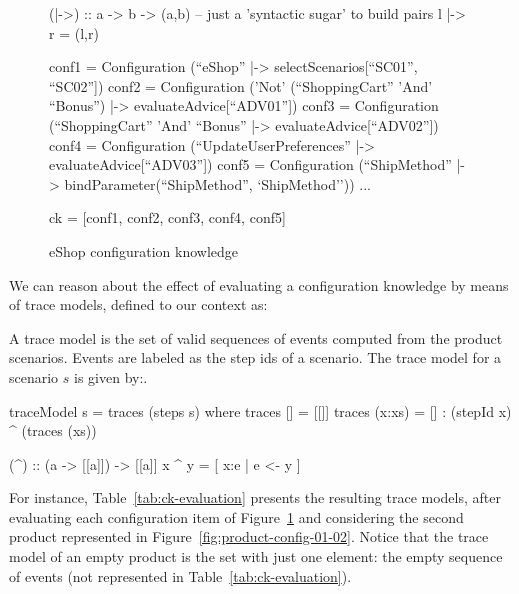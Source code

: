 \begin{figure}[hbt]
 \begin{code}
  (|->) :: a -> b -> (a,b) -- just a 'syntactic sugar' to build pairs
  l |-> r = (l,r)

  conf1 = Configuration (``eShop'' |-> selectScenarios[``SC01'', ``SC02''])
  conf2 = Configuration ('Not' (``ShoppingCart'' 'And' ``Bonus'') |-> evaluateAdvice[``ADV01''])
  conf3 = Configuration (``ShoppingCart'' 'And' ``Bonus'' |-> evaluateAdvice[``ADV02''])
  conf4 = Configuration (``UpdateUserPreferences'' |-> evaluateAdvice[``ADV03''])
  conf5 = Configuration (``ShipMethod'' |-> bindParameter(``ShipMethod'', `ShipMethod''))
  ...

  ck = [conf1, conf2, conf3, conf4, conf5]
 \end{code}
\caption{eShop configuration knowledge}
\label{fig:ck-running-example}
\end{figure}

We can reason about the effect of evaluating a configuration knowledge
by means of trace models, defined to our context as:


\begin{definition}
A trace model is the set of valid sequences of events
computed from the product scenarios. Events are labeled as the step ids of a
scenario. The trace model for a scenario $s$ is given by:.
\end{definition}

\begin{code}
traceModel s = traces (steps s)
where
  traces [] = [[]]
  traces (x:xs) = [] : (stepId x) ^ (traces (xs))

(^) :: (a -> [[a]]) -> [[a]]
x ^ y = [ x:e | e <- y ]
\end{code}

For instance, Table~\ref{tab:ck-evaluation} presents the resulting trace models,
after evaluating each configuration item of Figure~\ref{fig:ck-running-example}
and considering the second product represented in
Figure~\ref{fig:product-config-01-02}. Notice that the trace model of an empty
product is the set with just one element: the empty sequence of events (not
represented in Table~\ref{tab:ck-evaluation}).

